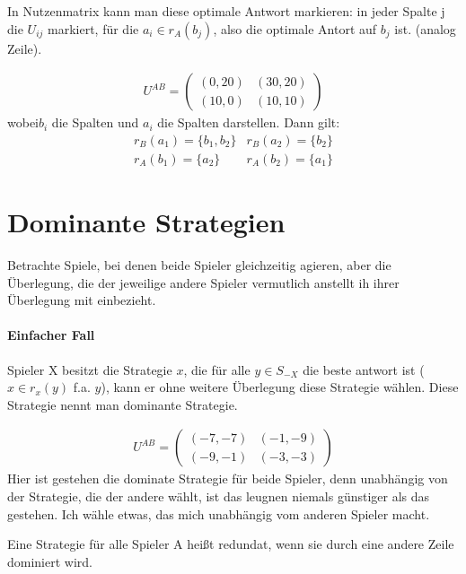 In Nutzenmatrix kann man diese optimale Antwort markieren: in jeder Spalte j die $U_{ij}$ markiert, für die $a_i \in r_A(b_j)$, also die optimale Antort auf $b_j$ ist. (analog Zeile). 

\begin{bsp}
	\begin{align*}
		U^{AB} = \begin{pmatrix}
			(0,20) & (30,20) \\ (10,0) & (10,10) 
		\end{pmatrix}
	\end{align*}
	wobei$b_i$ die Spalten und $a_i$ die Spalten darstellen. Dann gilt: 
	\begin{align*}
		r_B(a_1) = \{b_1,b_2\} & r_B(a_2)= \{b_2\} \\
		r_A(b_1) = \{a_2\} & r_A(b_2) = \{a_1\}
	\end{align*} 
\end{bsp}

\section{Dominante Strategien}
Betrachte Spiele, bei denen beide Spieler gleichzeitig agieren, aber die Überlegung, die der jeweilige andere Spieler vermutlich anstellt ih ihrer Überlegung mit einbezieht. 

\paragraph*{Einfacher Fall}
Spieler X besitzt die Strategie $x$, die für alle $y \in S_{-X}$ die beste antwort ist ($x \in r_x(y)$ f.a. $y$), kann er ohne weitere Überlegung diese Strategie wählen. Diese Strategie nennt man dominante Strategie. 

\begin{bsp}[Gefangenendilemma]
	\begin{align*}
		U^{AB} = \begin{pmatrix}
			(-7,-7) & (-1,-9) \\
			(-9,-1) & (-3,-3) 
		\end{pmatrix}
	\end{align*}
	Hier ist \glqq gestehen \grqq die dominate Strategie für beide Spieler, denn unabhängig von der Strategie, die der andere wählt, ist das leugnen niemals günstiger als das gestehen. \glqq Ich wähle etwas, das mich unabhängig vom anderen Spieler macht.\grqq 
\end{bsp}

Eine Strategie für alle Spieler A heißt redundat, wenn sie durch eine andere Zeile dominiert wird. 

